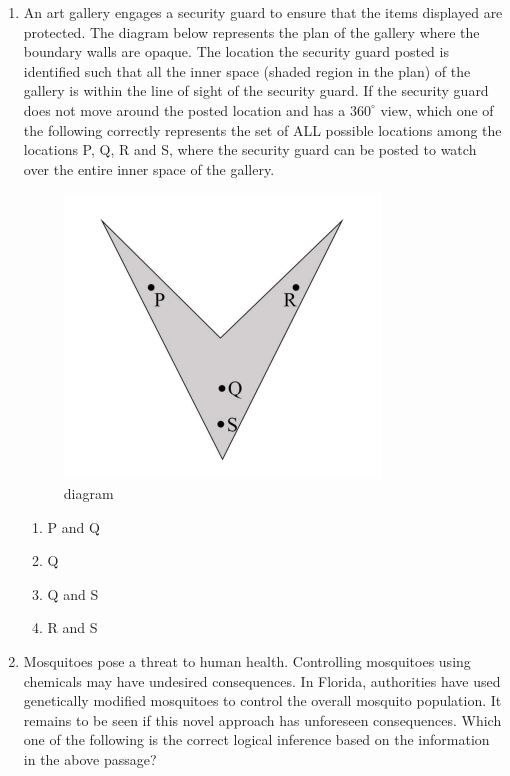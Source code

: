 \documentclass[journal,12pt,onecolumn]{IEEEtran}
\theoremstyle{remark}
\begin{document}
\begin{enumerate}
\hfill{}
\begin{multicols}{4}
\begin{enumerate}
\item $15$
\item $20$ 
\item $21$
\item $26$
\end{enumerate}
\end{multicols}
\item An art gallery engages a security guard to ensure that the items displayed are
protected. The diagram below represents the plan of the gallery where the
boundary walls are opaque. The location the security guard posted is identified
such that all the inner space (shaded region in the plan) of the gallery is within
the line of sight of the security guard.
If the security guard does not move around the posted location and has a $360^\circ$ view, which one of the following correctly represents the set of ALL possible
locations among the locations P, Q, R and S, where the security guard can be
posted to watch over the entire inner space of the gallery. 
\begin{figure}[H]
  \centering
  \includegraphics[width=0.4\columnwidth]{figs/tri.png}
  \caption{diagram}
  \label{fig:tri}
\end{figure}
\hfill{} 
\begin{multicols}{4}
\begin{enumerate}
\item P and Q 
\item Q 
\item Q and S
\item R and S 
\end{enumerate}
\end{multicols}
\item Mosquitoes pose a threat to human health. Controlling mosquitoes using chemicals may have undesired consequences. In Florida, authorities have used
genetically modified mosquitoes to control the overall mosquito population. It remains to be seen if this novel approach has unforeseen consequences.
Which one of the following is the correct logical inference based on the information in the above passage? 


\end{enumerate}
\end{document}
